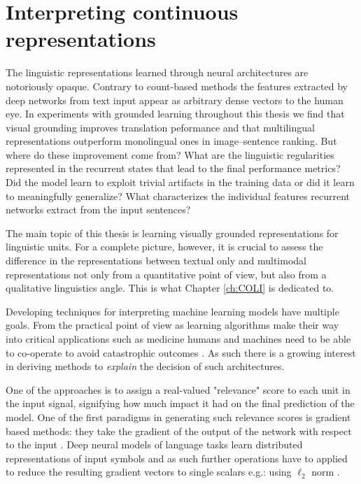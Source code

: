 \section{Interpreting continuous representations}
\label{sec:interpret}
The linguistic representations learned through neural architectures are notoriously opaque.
Contrary to count-based methods the features extracted by deep networks from text input
appear as arbitrary dense vectors to the human eye.
In experiments with grounded learning throughout this thesis we find that visual grounding
improves translation peformance and that multilingual representations outperform monolingual 
ones in image--sentence ranking.
But where do these improvement come from? What are the linguistic
regularities represented in the recurrent states that lead to the final performance metrics?
Did the model learn to exploit trivial artifacts in the training data or did it learn to meaningfully generalize?
What characterizes the individual features recurrent networks extract from the input sentences?

The main topic of this thesis is learning visually grounded representations for linguistic units.
For a complete picture, however, it is crucial to assess the difference in the representations
between textual only and multimodal representations not only from a quantitative point of view,
but also from a qualitative linguistics angle.
This is what Chapter \ref{ch:COLI} is dedicated to.

Developing techniques for interpreting machine learning models have multiple goals.
From the practical point of view as learning algorithms make their way into critical applications
such as medicine humans and machines need to be able to co-operate to avoid catastrophic
outcomes \citep{caruana2015intelligible}. As such there is a growing interest in deriving methods
to \emph{explain} the decision of such architectures.

One of the approaches is to assign a real-valued "relevance" score to each unit in the input signal,
signifying how much impact it had on the final prediction of the model.
One of the first paradigms in generating such relevance scores is gradient based methods:
they take the gradient of the output of the network with respect to the input \cite{simonyan2013deep}.
Deep neural models of language tasks learn distributed representations of input symbols
and as such further operations have to applied to reduce the resulting gradient vectors to
single scalars e.g.: using $\ell_2$ norm \citep{bansal2016ask}.

